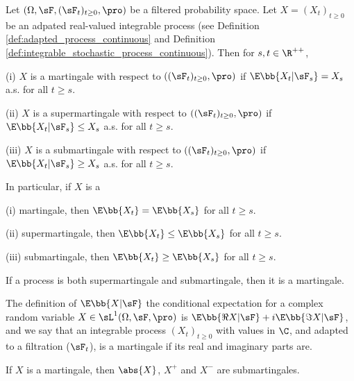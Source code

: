 \begin{definition}\label{def:martingale_super_sub_continuous}
Let $(\Omega,\sF, (\sF_t)_{t\geq 0},\pro)$ be a filtered probability space. Let $X = (X_t)_{t\geq 0}$ be an adpated real-valued integrable process (see Definition \ref{def:adapted_process_continuous} and Definition \ref{def:integrable_stochastic_process_continuous}). Then for $s,t\in \R^{++}$,
\ben
\item [(i)] $X$ is a martingale with respect to $((\sF_t)_{t\geq 0},\pro)$ if $\E\bb{X_t | \sF_s} = X_s$ a.s. for all $t \geq s$.
\item [(ii)] $X$ is a supermartingale with respect to $((\sF_t)_{t\geq 0},\pro)$ if $\E\bb{X_t | \sF_s}\leq X_s$ a.s. for all $t\geq s$.
\item [(iii)] $X$ is a submartingale with respect to $((\sF_t)_{t\geq 0},\pro)$ if $\E\bb{X_t | \sF_s} \geq X_s$ a.s. for all $t\geq s$.
\een

In particular, if $X$ is a
\ben
\item [(i)] martingale, then $\E\bb{X_t} = \E\bb{X_s}$ for all $t\geq s$.
\item [(ii)] supermartingale, then $\E\bb{X_t} \leq \E\bb{X_s}$ for all $t\geq s$.
\item [(iii)] submartingale, then $\E\bb{X_t} \geq \E\bb{X_s}$ for all $t\geq s$.
\een
\end{definition}

\begin{remark}
If a process is both supermartingale and submartingale, then it is a martingale.
\end{remark}

\begin{remark}
The definition of $\E\bb{X|\sF}$ the conditional expectation for a complex random variable $X \in \sL^1(\Omega,\sF,\pro)$ is $\E\bb{\Re X|\sF} + i\E\bb{\Im X|\sF}$, and we say that an integrable process $(X_t)_{t \geq 0}$
with values in $\C$, and adapted to a filtration ($\sF_t$), is a martingale if its real and imaginary parts are.
\end{remark}

\begin{proposition}\label{pro:martingale_abs_plus_minus_submartingale}
If $X$ is a martingale, then $\abs{X}$, $X^+$ and $X^-$ are submartingales.
\end{proposition}

